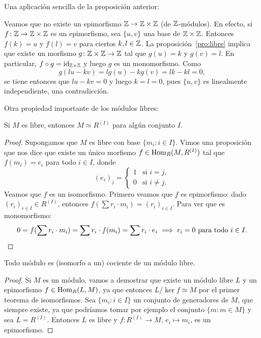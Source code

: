 Una aplicación sencilla de la proposición anterior:

\begin{example}
Veamos que no existe un epimorfismo $\mathbb{Z}\to\mathbb{Z}\times\mathbb{Z}$ (de $\mathbb{Z}$-módulos). En efecto, si $f\colon\mathbb{Z}\to\mathbb{Z}\times\mathbb{Z}$ es un epimorfismo, 
sea $\{u,v\}$ una base de $\mathbb{Z}\times\mathbb{Z}$. Entonces $f(k)=u$ y $f(l)=v$ para ciertos $k,l\in\mathbb{Z}$. La proposición~\ref{pro:libre} implica
que existe un morfismo $g\colon\mathbb{Z}\times\mathbb{Z}\to\mathbb{Z}$ tal que $g(u)=k$ y $g(v)=l$. En particular, $f\circ g=\operatorname{id}_{\mathbb{Z}\times\mathbb{Z}}$ y luego 
$g$ es un monomorfismo. 	Como 
\[
g(lu-kv)=lg(u)-kg(v)=lk-kl=0,
\]
se tiene entonces que $lu-kv=0$ y luego $k=l=0$, pues $\{u,v\}$ es linealmente independiente, una contradicción.  
\end{example}

Otra propiedad importante de los módulos libres:

\begin{proposition}
Si $M$ es libre, entonces $M\simeq R^{(I)}$ para algún conjunto $I$.
\end{proposition}

\begin{proof}
Supongamos que $M$ es libre con base $\{m_i:i\in I\}$. Vimos una proposición que nos dice que 
existe un único morfismo $f\in\operatorname{Hom}_R(M,R^{(I)})$ tal que 
$f(m_i)=e_i$ para todo $i\in I$, donde 
\[
(e_i)_j=\begin{cases}
	1 & \text{si $i=j$},\\
	0 & \text{si $i\ne j$.}
	\end{cases}	
\]	
Veamos que $f$ es un isomorfismo. 
Primero veamos que $f$ es epimorfismo: dado $(r_i)_{i\in I}\in R^{(I)}$, entonces
$f(\sum r_i\cdot m_i)=(r_i)_{i\in I}$. Para ver que es monomorfismo:
\[
0=f(\sum r_i\cdot m_i)=\sum r_i\cdot f(m_i)=\sum r_i\cdot e_i\implies r_i=0\text{ para todo $i\in I$}.\qedhere
\]
\end{proof}

\begin{corollary}
Todo módulo es (isomorfo a un) cociente de un módulo libre.
\end{corollary}

\begin{proof}
Si $M$ es un módulo, vamos a demostrar que existe un módulo libre $L$ y un epimorfismo $f\in\operatorname{Hom}_R(L,M)$, ya que
entonces $L/\ker f\simeq M$ por el primer teorema de isomorfismos. Sea 
$\{m_i:i\in I\}$ un conjunto de generadores de $M$, que siempre existe, ya que podríamos tomar por ejemplo el conjunto
$\{m:m\in M\}$ y sea $L=R^{(I)}$. Entonces $L$ es libre y $f\colon R^{(I)}\to M$, $e_i\mapsto m_i$, es un epimorfismo. 
\end{proof}

